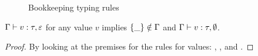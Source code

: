 \documentclass[a4paper]{article}
\begin{document}
\begin{figure}[htpb]
  \begin{center}
  \end{center}
  \caption{Bookkeeping typing rules}
  \label{fig:advtyprules}
\end{figure}


\begin{prop}
  \label{prop:capvalues}
  $\Gamma \vdash v : \tau, \varepsilon $ for any value $v$ implies {\normalfont
  $\left\{ \_ \right\}\notin\Gamma$} and $\Gamma \vdash v : \tau, \emptyset $.
\end{prop}
\begin{proof}
  By looking at the premises for the rules for values: \varrule, \conrule,
  \absrule{} and \absregrule.
\end{proof}
\end{document}
